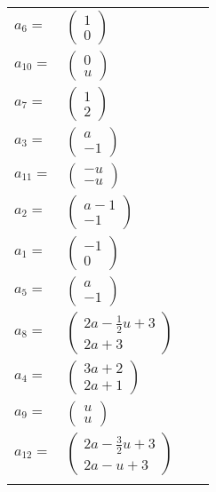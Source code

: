 \documentclass[1p]{elsarticle_modified}
\theoremstyle{definition}
\begin{document}
\begin{tabular}{m{7pt} m{180pt} m{7pt} m{180pt} }
\flushright $a_{6}=$&$\begin{pmatrix}1\\0\end{pmatrix}$ \\
\flushright $a_{10}=$&$\begin{pmatrix}0\\u\end{pmatrix}$ \\
\flushright $a_{7}=$&$\begin{pmatrix}1\\2\end{pmatrix}$ \\
\flushright $a_{3}=$&$\begin{pmatrix}a\\-1\end{pmatrix}$ \\
\flushright $a_{11}=$&$\begin{pmatrix}- u\\- u\end{pmatrix}$ \\
\flushright $a_{2}=$&$\begin{pmatrix}a-1\\-1\end{pmatrix}$ \\
\flushright $a_{1}=$&$\begin{pmatrix}-1\\0\end{pmatrix}$ \\
\flushright $a_{5}=$&$\begin{pmatrix}a\\-1\end{pmatrix}$ \\
\flushright $a_{8}=$&$\begin{pmatrix}2 a-\frac{1}{2} u+3\\2 a+3\end{pmatrix}$ \\
\flushright $a_{4}=$&$\begin{pmatrix}3 a+2\\2 a+1\end{pmatrix}$ \\
\flushright $a_{9}=$&$\begin{pmatrix}u\\u\end{pmatrix}$ \\
\flushright $a_{12}=$&$\begin{pmatrix}2 a-\frac{3}{2} u+3\\2 a- u+3\end{pmatrix}$\\&\end{tabular}
\end{document}
